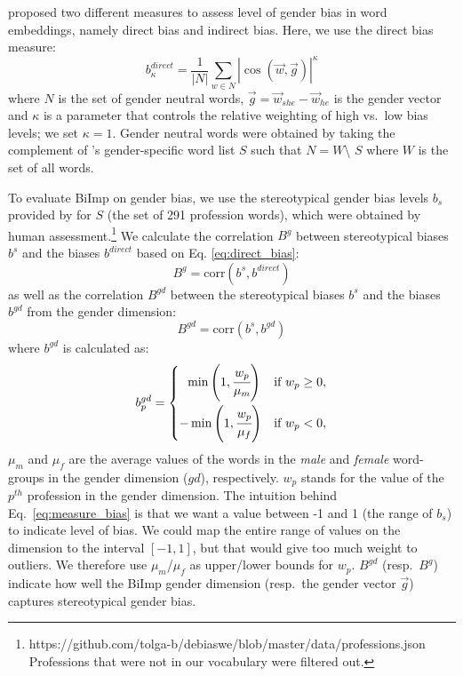 \documentclass[11pt,a4paper]{article}
\def\proposedmethod{BiImp}
\begin{document}

\citet{bolukbasi16debiasing} proposed two different measures to assess level of gender bias in word embeddings, namely direct bias and indirect bias. Here, we use the direct bias measure:
\begin{equation}
b^{direct}_\kappa = \frac{1}{|N|}\sum_{w\in N}|\cos(\vec{w},\vec{g})|^\kappa
\label{eq:direct_bias}
\end{equation}
where $N$ is the set of gender neutral words,
$\vec{g}= \vec{w}_{she} - \vec{w}_{he}$ is the gender vector
and $\kappa$ is a parameter that
controls the relative weighting of high vs.\ low bias
levels; we set $\kappa=1$. Gender
neutral words were obtained by taking the complement of 
\citet{bolukbasi16debiasing}'s 
gender-specific word list $S$ such that $N = W$\textbackslash
$S$ where $W$ is the set of all words.

To evaluate \proposedmethod{} on gender bias,
we use the stereotypical gender bias levels $b_s$
provided by
\citet{bolukbasi16debiasing} for $S$
(the set of 291 profession words), which were obtained by human
assessment.\footnote{https://github.com/tolga-b/debiaswe/blob/master/data/professions.json\\ Professions
  that were not in our vocabulary were filtered out.} 
We calculate the correlation $B^{g}$ between stereotypical biases $b^s$  and the biases
$b^{direct}$  based on Eq. \ref{eq:direct_bias}:
\begin{equation}
    B^{g} = \mbox{corr}(b^s,b^{direct})
    \label{eq:bg}
\end{equation}
as well as the correlation $B^{gd}$ between the stereotypical biases $b^s$ and the biases
$b^{gd}$ from the gender dimension:
\begin{equation}
    B^{gd} = \mbox{corr}(b^s,b^{gd}) \label{eq:bgd}
\end{equation}
where $b^{gd}$ is calculated as:
\begin{align}
     b^{gd}_p = 
     \begin{cases}
		~~\min \left( 1, \cfrac{w_{p}}{\mu_m} \right) & \text{if } w_{p} \geq 0, \vspace{0.1cm} \\ 
		-\min \left( 1, \cfrac{w_{p}}{\mu_f} \right) & \text{if } w_{p} < 0,
	\end{cases}
	\label{eq:measure_bias}
\end{align}
$\mu_m$ and $\mu_f$ are the average values of the words in
the \textit{male} and \textit{female} word-groups in the
gender dimension ($gd$), respectively. $w_p$ stands for the
value of the $p^{th}$ profession in the gender
dimension.
The intuition behind Eq.\ \ref{eq:measure_bias} is that we
want a value between -1 and 1 (the range of $b_s$) to
indicate level of bias. We could map the entire range
of values on the dimension to the interval $[-1,1]$, but
that would give too much weight to outliers. We therefore
use
 $\mu_m$/$\mu_f$ as upper/lower bounds for $w_p$.
$B^{gd}$ (resp.\ $B^g$) indicate how well the
\proposedmethod{} gender dimension (resp.\ the gender vector $\vec{g}$) captures
stereotypical gender bias.
\end{document}
